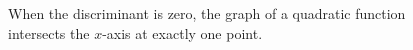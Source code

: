 \documentclass[a4paper,oneside,12pt]{article}
\begin{document}
\begin{figure}[!htbp]
\centering
{}
\qquad
\caption{%
  When the discriminant is zero, the graph of a quadratic function
  intersects the $x$-axis at exactly one point.
}
\label{fig:zero_discriminant}
\end{figure}
\end{document}
